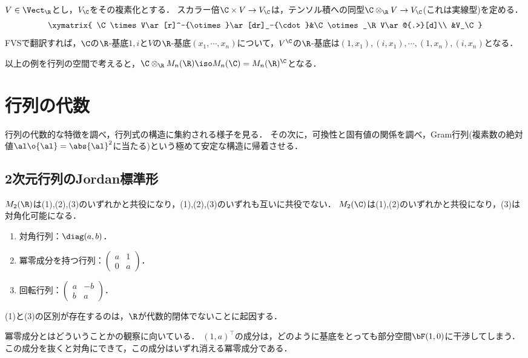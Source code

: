 \documentclass[uplatex, dvipdfmx]{jsreport}
\begin{document}
\begin{example}
    $V\in\Vect_\R$とし，$V_\C$をその複素化とする．
    スカラー倍$\C\times V\to V_\C$は，テンソル積への同型$\C\otimes_\R V\to V_\C$(これは実線型)を定める．
    \[\xymatrix{
        \C\times V\ar[r]^-{\otimes}\ar[dr]_-{\cdot}&\C\otimes_\R V\ar@{.>}[d]\\
        &V_\C
    }\]
    FVSで翻訳すれば，$\C$の$\R$-基底$1,i$と$V$の$\R$-基底$(x_1,\cdots,x_n)$について，$V^\C$の$\R$-基底は$(1,x_1),(i,x_1),\cdots,(1,x_n),(i,x_n)$となる．
\end{example}

\begin{example}[複素行列]
    以上の例を行列の空間で考えると，$\C\otimes_\R M_n(\R)\iso M_n(\C)=M_n(\R)^\C$となる．
\end{example}

\section{行列の代数}

\begin{tcolorbox}[colframe=ForestGreen, colback=ForestGreen!10!white,breakable,colbacktitle=ForestGreen!40!white,coltitle=black,fonttitle=\bfseries\sffamily,
title=]
    行列の代数的な特徴を調べ，行列式の構造に集約される様子を見る．
    その次に，可換性と固有値の関係を調べ，Gram行列(複素数の絶対値$\al\o{\al}=\abs{\al}^2$に当たる)という極めて安定な構造に帰着させる．
\end{tcolorbox}

\subsection{2次元行列のJordan標準形}

\begin{proposition}
    $M_2(\R)$は(1),(2),(3)のいずれかと共役になり，(1),(2),(3)のいずれも互いに共役でない．
    $M_2(\C)$は(1),(2)のいずれかと共役になり，(3)は対角化可能になる．
    \begin{enumerate}
        \item 対角行列：$\diag(a,b)$．
        \item 冪零成分を持つ行列：$\begin{pmatrix}a&1\\0&a\end{pmatrix}$．
        \item 回転行列：$\begin{pmatrix}a&-b\\b&a\end{pmatrix}$．
    \end{enumerate}
    (1)と(3)の区別が存在するのは，$\R$が代数的閉体でないことに起因する．
\end{proposition}
\begin{remarks}
    冪零成分とはどういうことかの観察に向いている．
    $(1,a)^\top$の成分は，どのように基底をとっても部分空間$\bF(1,0)$に干渉してしまう．
    この成分を抜くと対角にできて，この成分はいずれ消える冪零成分である．
\end{remarks}
\end{document}
